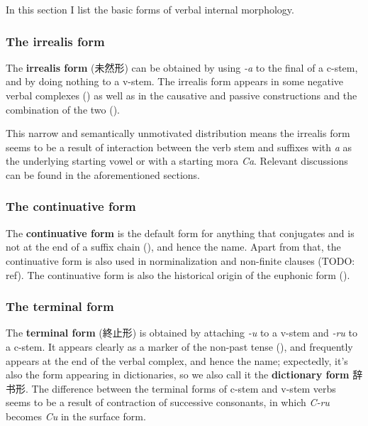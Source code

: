 \documentclass[UTF8, a4paper, oneside, scheme=plain]{ctexrep}
\newcommand*{\concept}[1]{\textbf{#1}}
\newcommand{\corpus}[1]{\emph{#1}}
\begin{document}
In this section I list the basic forms of verbal internal morphology.

\subsubsection{The irrealis form}\label{sec:irrealis-form}

The \concept{irrealis form} (未然形) can be obtained by using \corpus{-a} to the final of a c-stem,
and by doing nothing to a v-stem.
The irrealis form appears in some negative verbal complexes ()
as well as in the causative and passive constructions 
and the combination of the two (). 

This narrow and semantically unmotivated distribution means 
the irrealis form seems to be a result of  
interaction between the verb stem and 
suffixes with \corpus{a} as the underlying starting vowel or with a starting mora \corpus{Ca}.
Relevant discussions can be found in the aforementioned sections.

\subsubsection{The continuative form}\label{sec:continuative-form}

The \concept{continuative form} is the default form for anything that conjugates
and is not at the end of a suffix chain (),
and hence the name.
Apart from that, the continuative form is also used in norminalization and non-finite clauses (TODO: ref).
The continuative form is also the historical origin of the euphonic form ().

\subsubsection{The terminal form}\label{sec:terminal-form}

The \concept{terminal form} (終止形) is obtained by attaching \corpus{-u} to a v-stem and \corpus{-ru} to a c-stem.
It appears clearly as a marker of the non-past tense (),
and frequently appears at the end of the verbal complex, and hence the name;
expectedly, it's also the form appearing in dictionaries,
so we also call it the \concept{dictionary form} 辞书形.
The difference between the terminal forms of c-stem and v-stem verbs 
seems to be a result of contraction of successive consonants,
in which \corpus{C-ru} becomes \corpus{Cu} in the surface form.
\end{document}
